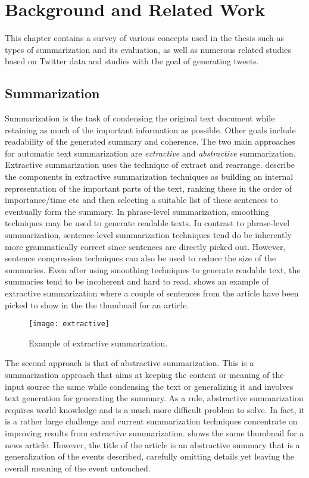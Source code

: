 \chapter{Background and Related Work}
\label{chap:background}

This chapter contains a survey of various concepts used in the thesis such as types of summarization and its evaluation, as well as numerous related studies based on Twitter data and studies with the goal of generating tweets.


\section{Summarization}

Summarization is the task of condensing the original text document while retaining as much of the important information as possible. Other goals include readability of the generated summary and coherence. The two main approaches for automatic text summarization are \textit{extractive} and \textit{abstractive} summarization. Extractive summarization uses the technique of extract and rearrange. \cite{nenkova2012survey} describe the components in extractive summarization techniques as building an internal representation of the important parts of the text, ranking these in the order of importance/time etc and then selecting a suitable list of these sentences to eventually form the summary. In phrase-level summarization, smoothing techniques may be used to generate readable texts. In contrast to phrase-level summarization, sentence-level summarization techniques tend do be inherently more grammatically correct since sentences are directly picked out. However, sentence compression techniques can also be used to reduce the size of the summaries. Even after using smoothing techniques to generate readable text, the summaries tend to be incoherent and hard to read.  shows an example of extractive summarization where a couple of sentences from the article have been picked to show in the the thumbnail for an article.

\begin{figure}[!htbp]
\centering
\texttt{[image: extractive]}
\caption{Example of extractive summarization.}
\label{fig:extractive}
\end{figure}


The second approach is that of abstractive summarization. This is a summarization approach that aims at keeping the content or meaning of the input source the same while condensing the text or generalizing it and involves text generation for generating the summary. As a rule, abstractive summarization requires world knowledge and is a much more difficult problem to solve. In fact, it is a rather large challenge and current summarization techniques concentrate on improving results from extractive summarization.  shows the same thumbnail for a news article. However, the title of the article is an abstractive summary that is a generalization of the events described, carefully omitting details yet leaving the overall meaning of the event untouched.

